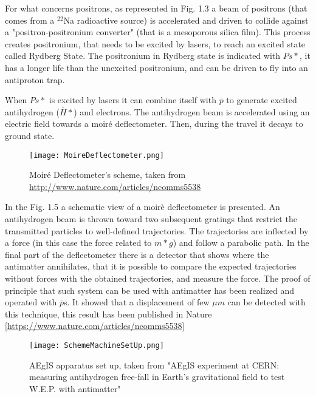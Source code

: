 For what concerns positrons, as represented in Fig. 1.3 a beam of positrons (that comes from a $^{22}$Na radioactive source) is accelerated and driven to collide against a "positron-positronium converter" (that is a mesoporous silica film). This process creates positronium, that needs to be excited by lasers, to reach an excited state called Rydberg State. The positronium in Rydberg state is indicated with $ {Ps*} $, it has a longer life than the unexcited positronium, and can be driven to fly into an antiproton trap.


When $ {Ps*} $ is excited by lasers it can combine itself with $ \overline{p} $ to generate excited antihydrogen ($ \overline{H}* $) and electrons. The antihydrogen beam is accelerated using an electric field towards a moiré deflectometer. Then, during the travel it decays to ground state.  


\begin{figure}[H]
\centering
\texttt{[image: MoireDeflectometer.png]} 
\caption{Moiré Deflectometer's scheme, taken from \url{http://www.nature.com/articles/ncomms5538} }
\end{figure}

In the Fig. 1.5 a schematic view of a moirè deflectometer is presented.
An antihydrogen beam is thrown toward two subsequent gratings that restrict the transmitted particles to well-defined trajectories. The trajectories are inflected by a force (in this case the force related to $ {m*g} $) and follow a parabolic path. In the final part of the deflectometer there is a detector that shows where the antimatter annihilates, that it is possible to compare the expected trajectories without forces with the obtained trajectories, and measure the force. The proof of principle that such system can be used with antimatter has been realized and operated with $ \overline{p} $s. It showed that a displacement of few $ \mu m $ can be detected with this technique, this result has been published in Nature [\url{https://www.nature.com/articles/ncomms5538}]


\begin{figure}[H]
\centering
\texttt{[image: SchemeMachineSetUp.png]} 
\caption{AEgIS apparatus set up, taken from "AEgIS experiment at CERN: measuring antihydrogen free-fall in Earth’s gravitational field to test W.E.P. with antimatter" }
\end{figure}
